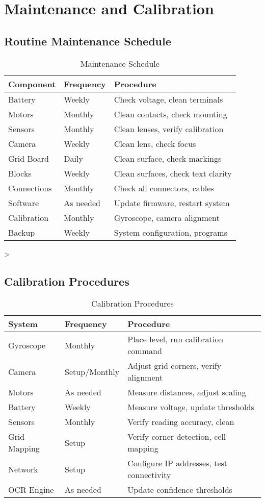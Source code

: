 \section{Maintenance and Calibration}

\subsection{Routine Maintenance Schedule}

\begin{table}[H]
\centering
\caption{Maintenance Schedule}
\begin{tabular}{|l|l|l|}
\hline
\textbf{Component} & \textbf{Frequency} & \textbf{Procedure} \\
\hline
Battery & Weekly & Check voltage, clean terminals \\
Motors & Monthly & Clean contacts, check mounting \\
Sensors & Monthly & Clean lenses, verify calibration \\
Camera & Weekly & Clean lens, check focus \\
Grid Board & Daily & Clean surface, check markings \\
Blocks & Weekly & Clean surfaces, check text clarity \\
Connections & Monthly & Check all connectors, cables \\
Software & As needed & Update firmware, restart system \\
Calibration & Monthly & Gyroscope, camera alignment \\
Backup & Weekly & System configuration, programs \\
\hline
\end{tabular}
\label{tab:maintenance}
\end{table}>

\subsection{Calibration Procedures}

\begin{table}[H]
\centering
\caption{Calibration Procedures}
\begin{tabular}{|l|l|l|}
\hline
\textbf{System} & \textbf{Frequency} & \textbf{Procedure} \\
\hline
Gyroscope & Monthly & Place level, run calibration command \\
Camera & Setup/Monthly & Adjust grid corners, verify alignment \\
Motors & As needed & Measure distances, adjust scaling \\
Battery & Weekly & Measure voltage, update thresholds \\
Sensors & Monthly & Verify reading accuracy, clean \\
Grid Mapping & Setup & Verify corner detection, cell mapping \\
Network & Setup & Configure IP addresses, test connectivity \\
OCR Engine & As needed & Update confidence thresholds \\
\hline
\end{tabular}
\label{tab:calibration}
\end{table}